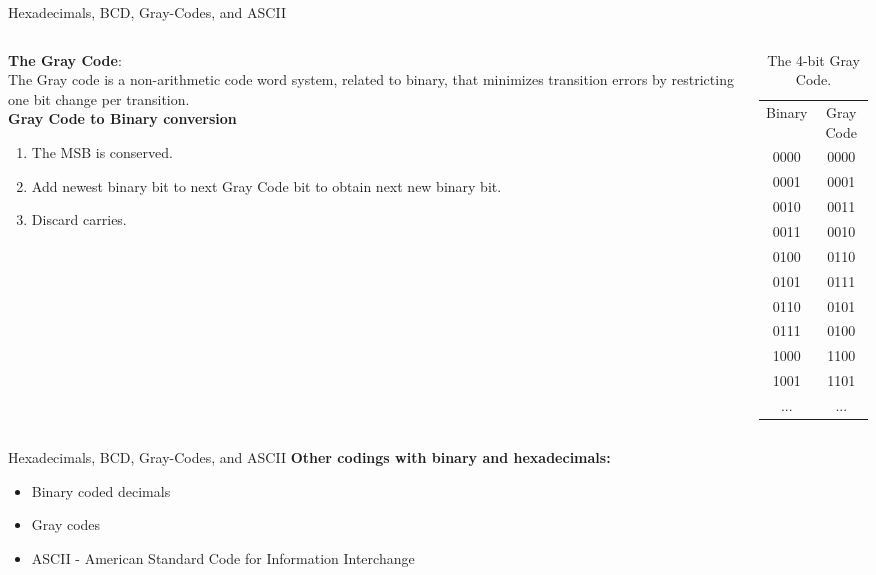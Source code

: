 \documentclass{beamer}
\begin{document}
\begin{frame}{Hexadecimals, BCD, Gray-Codes, and ASCII}
\small
\begin{columns}[T]
\begin{column}{0.5\textwidth}
\textbf{The Gray Code}: \\ \vspace{0.5cm}
The Gray code is a non-arithmetic code word system, related to binary, that minimizes transition errors by restricting one bit change per transition. \\ \vspace{0.5cm}
\textbf{Gray Code to Binary conversion}
\begin{enumerate}
\item The MSB is conserved.
\item Add newest binary bit to next Gray Code bit to obtain next new binary bit.
\item Discard carries.
\end{enumerate}
\end{column}
\begin{column}{0.5\textwidth}
\begin{table}
\centering
\begin{tabular}{c c}
Binary & Gray Code \\
0000 & 0000 \\
0001 & 0001 \\
0010 & 0011 \\
0011 & 0010 \\
0100 & 0110 \\
0101 & 0111 \\
0110 & 0101 \\
0111 & 0100 \\
1000 & 1100 \\
1001 & 1101 \\
... & ... 
\end{tabular}
\caption{\label{tab:grayCode2} \small The 4-bit Gray Code.}
\end{table}
\end{column}
\end{columns}
\end{frame}

\begin{frame}{Hexadecimals, BCD, Gray-Codes, and ASCII}
\textbf{Other codings with binary and hexadecimals:}
\begin{itemize}
\item \alert{Binary coded decimals}
\item \alert{Gray codes}
\item ASCII - American Standard Code for Information Interchange
\end{itemize}
\end{frame}
\end{document}
